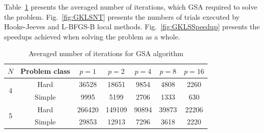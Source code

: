 \documentclass[runningheads]{llncs}
\begin{document}
Table~\ref{tab:5} presents the averaged number of iterations, which GSA required to solve the problem. Fig.~\ref{fig:GKLSNT} presents the numbers of trials executed by Hooke-Jeeves and L-BFGS-B local methods. Fig.~\ref{fig:GKLSSpeedup} presents the speedups achieved when solving the problem as a whole.

\begin{table}[ht]
	\caption{Averaged number of iterations for GSA algorithm}
	\label{tab:5}
	\center
	\begin{tabular}{|c|c|c|c|c|c|c|}
		\hline
		$N$ & Problem class & $p=1$ & $p=2$ & $p=4$ & $p=8$ & $p=16$ \\
		\hline 
		    \multirow{2}{*}{4} & Hard & 36528 & 18651 & 9854 & 4808 & 2260 \\ \cline{2-7}
		                       & Simple & 9995 & 5199 & 2706 & 1333 & 630 \\
		\hline
		    \multirow{2}{*}{5} & Hard & 266420 & 149109 & 90894 & 39873 & 22206 \\ \cline{2-7}
		                       & Simple & 29853 & 12913 & 7296 & 3618 & 2220 \\
		\hline
	\end{tabular}
\end{table}
\end{document}

